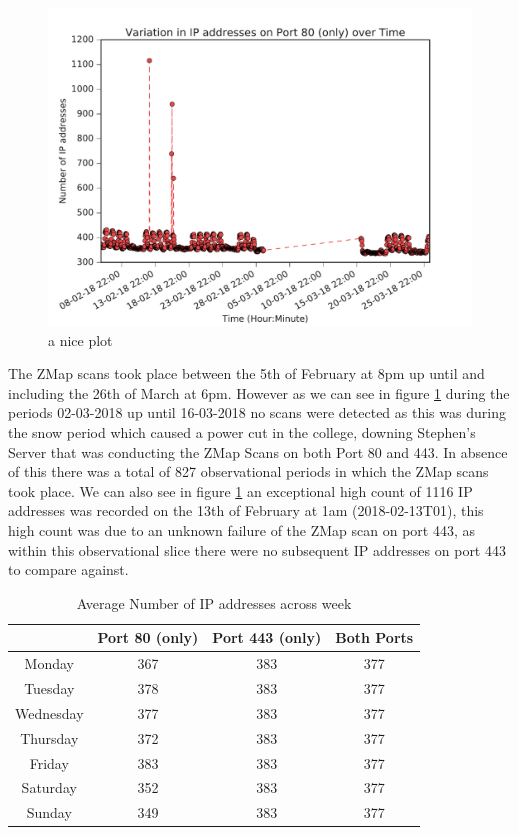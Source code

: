 \documentclass[a4wide,leqno,12pt]{report}
\begin{document}
\begin{figure}[h!]
\includegraphics[scale=.5]{pdf_images/VariationInIpAddressesOnPort80OverTime}
\caption{a nice plot}
\label{fig:port80ZMap}
\end{figure}

The ZMap scans took place between the 5th of February at 8pm up until and including the 26th of March at 6pm. However as we can see in figure \ref{fig:port80ZMap} during the periods
02-03-2018  up until 16-03-2018 no scans were detected as this was during the snow period which caused a power cut in the college, downing  Stephen's Server that was conducting the ZMap Scans on both Port 80 and 443. In absence of this there was a total of 827 observational periods in which the ZMap scans took place. We can also see in figure \ref{fig:port80ZMap} an exceptional high count of 1116 IP addresses was recorded on the 13th of February at 1am (2018-02-13T01), this high count was due to an unknown failure of the ZMap scan on port 443, as within this observational slice there were no subsequent IP addresses on port 443 to compare against.
\begin{table}
\centering
\begin{tabular}{||c c c c ||}
 \hline
  & Port 80 (only) & Port 443 (only) & Both Ports \\ [0.5ex]
 \hline\hline
 Monday & 367 & 383 & 377  \\
 Tuesday & 378 & 383 & 377 \\
 Wednesday & 377 & 383 & 377 \\
 Thursday & 372 & 383 & 377  \\
 Friday & 383 & 383 & 377 \\
 Saturday & 352 & 383 & 377\\
 Sunday & 349 & 383 & 377\\[1ex]
 \hline
\end{tabular}
\caption{Average Number of IP addresses across week}
\label{table:1}
\end{table}
\end{document}
